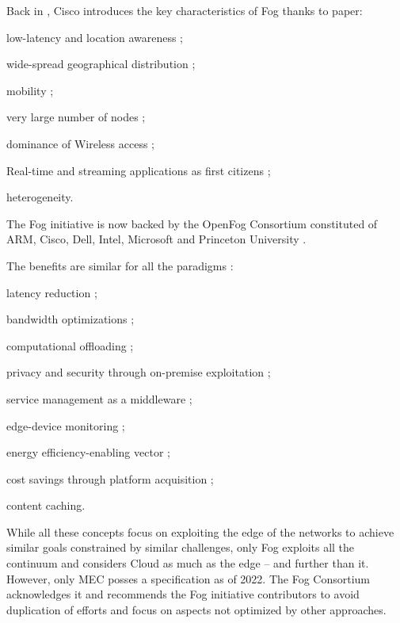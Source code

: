 \documentclass[11pt]{sdm}
\begin{document}
\begin{description}
		Back in , Cisco introduces the key characteristics of Fog thanks to  paper:
		\begin{enumerate*}[(i)]
			\item low-latency and location awareness ;
			\item wide-spread geographical distribution ;
			\item mobility ;
			\item very large number of nodes ;
			\item dominance of Wireless access ;
			\item Real-time and streaming applications as first citizens ;
			\item heterogeneity.
		\end{enumerate*}
		The Fog initiative is now backed by the OpenFog Consortium \cite{ieee_standards_association_ieee_2018} constituted of ARM, Cisco, Dell, Intel, Microsoft and Princeton University \cite{chiang_fog_2016}.
\end{description}

The benefits are similar for all the paradigms \cite{ahmed_fog_2019, ai_edge_2018}:
\begin{enumerate*}[(1)]
	\item latency reduction ;
	\item bandwidth optimizations ;
	\item computational offloading ;
	\item privacy and security through on-premise exploitation ;
	\item service management as a middleware ;
	\item edge-device monitoring ;
	\item energy efficiency-enabling vector ;
	\item cost savings through platform acquisition ;
	\item content caching.
\end{enumerate*}


While all these concepts focus on exploiting the edge of the networks to achieve similar goals constrained by similar challenges, only Fog exploits all the continuum and considers Cloud as much as the edge -- and further than it. However, only \gls{MEC} posses a specification as of 2022. The Fog Consortium acknowledges it and recommends the Fog initiative contributors to avoid duplication of efforts and focus on aspects not optimized by other approaches.
\end{document}
